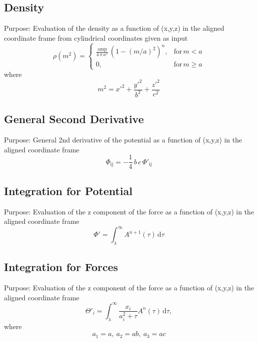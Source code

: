 \documentclass[a4paper,11pt]{article}
\begin{document}
		\subsection{Density} %
			Purpose: Evaluation of the density as a function of (x,y,z) in the aligned coordinate frame from cylindrical coordinates given as input\\
		\begin{equation*}
		\rho(m^2) = \begin{cases}
		\frac{\mathrm{amp}}{4\,\pi\,a^3}\,(1-(m/a)^2)^n, & \text{for}\, m < a \\
		0, & \text{for}\, m \geq a
		\end{cases}
		\end{equation*}
		where
		\begin{equation}
		m^2 = x'^2 + \frac{y'^2}{b^2}+\frac{z'^2}{c^2}
		\end{equation}
			


		\subsection{General Second Derivative}
			Purpose: General 2nd derivative of the potential as a function of (x,y,z) in the aligned coordinate frame \\
		\begin{equation}
		\Phi_{\mathrm{ij}} = -\frac{1}{4}\,b\,c \,\Phi'_{\mathrm{ij}}	
		\end{equation}
			
			
	
	
		\subsection{Integration for Potential}
			Purpose: Evaluation of the z component of the force as a function of (x,y,z) in the aligned coordinate frame \\
		\begin{equation}
		\Phi' = \int_{\lambda}^{\infty} A^{n+1}(\tau)\,\mathrm{d} \tau
		\end{equation}
			
	
	
		\subsection{Integration for Forces}
			Purpose: Evaluation of the z component of the force as a function of (x,y,z) in the aligned coordinate frame \\
		\begin{equation}
		\Theta'_i = \int_{\lambda}^{\infty} \frac{x_i}{a_i^2 + \tau} A^{n}(\tau)\,\mathrm{d} \tau,
		\end{equation}
		where
		\begin{equation}
		a_1 = a,~ a_2 = ab,~a_3 = ac
		\end{equation}
		
\end{document}
